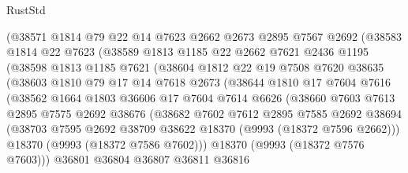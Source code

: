 \begin{lexlean}{RustStd}
\begin{coremodule}
            (@38571
              @1814
              @79
              @22
              @14
              @7623
              @2662
              @2673
              @2895
              @7567
              @2692
              (@38583
                @1814
                @22
                @7623
                (@38589
                  @1813
                  @1185
                  @22
                  @2662
                  @7621
                  @2436
                  @1195
                  (@38598
                    @1813
                    @1185
                    @7621
                    (@38604
                      @1812
                      @22
                      @19
                      @7508
                      @7620
                      @38635
                      (@38603
                        @1810
                        @79
                        @17
                        @14
                        @7618
                        @2673
                        (@38644
                          @1810
                          @17
                          @7604
                          @7616
                          (@38562
                            @1664
                            @1803
                            @36606
                            @17
                            @7604
                            @7614
                            @6626
                            (@38660
                              @7603
                              @7613
                              @2895
                              @7575
                              @2692
                              @38676
                              (@38682
                                @7602
                                @7612
                                @2895
                                @7585
                                @2692
                                @38694
                                (@38703
                                  @7595
                                  @2692
                                  @38709
                                  @38622
                                  @18370
                                  (@9993 (@18372 @7596 @2662)))
                                @18370
                                (@9993 (@18372 @7586 @7602)))
                              @18370
                              (@9993 (@18372 @7576 @7603)))
                            @36801
                            @36804
                            @36807
                            @36811
                            @36816

\end{coremodule}
\end{lexlean}
